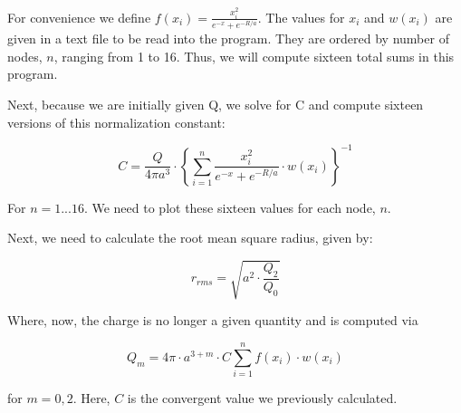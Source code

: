 \documentclass[11pt]{amsart}
\begin{document}
For convenience we define $f(x_i)=\frac{x_i^2}{e^{-x} + e^{-R/a}}$.  The values for $x_i$ and $w(x_i)$ are given in a text file to be read into the program.  They are ordered by number of nodes, $n$, ranging from 1 to 16.  Thus, we will compute sixteen total sums in this program.
\newline

Next, because we are initially given Q, we solve for C and compute sixteen versions of this normalization constant:

\begin{equation}
C = \frac{Q}{4 \pi a^3} \cdot \left \{ { \sum \limits_{i=1}^n \frac{x_i^2}{e^{-x} + e^{-R/a}} \cdot w(x_i)} \right \} ^{-1}
\end{equation}

For $n=1...16$.  We need to plot these sixteen values for each node, $n$.
\newline

Next, we need to calculate the root mean square radius, given by:

\begin{equation}
r_{rms} = \sqrt{a^2 \cdot \frac{Q_2}{Q_0}}
\end{equation}

Where, now, the charge is no longer a given quantity and is computed via

\begin{equation}
Q_m = 4 \pi \cdot a^{3+m} \cdot C \sum \limits_{i=1}^n f(x_i) \cdot w(x_i)
\end{equation}

for $m=0,2$. Here, $C$ is the convergent value we previously calculated.
\end{document}

